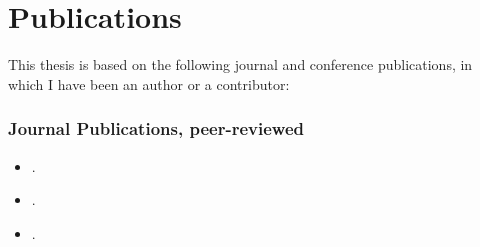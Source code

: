 \documentclass[ngerman,UKenglish,table]{scrbook}
\begin{document}
%


\nobibliography*

% 
% 
% 

\frontmatter

 
% 

\pagestyle{scrplain}



\chapter*{Publications}

This thesis is based on the following journal and conference publications, in which I have been an author or a contributor:


\subsection*{Journal Publications, peer-reviewed}

\begin{itemize}

\item {}.
\item {}.
\item {}.
\end{itemize}
\end{document}
